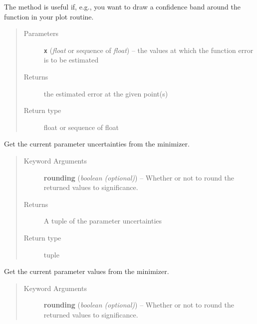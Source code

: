\documentclass[a4paper,10pt,english]{sphinxmanual}
\begin{document}
\begin{fulllineitems}
\begin{fulllineitems}
The method is useful if, e.g., you want to draw a confidence band
around the function in your plot routine.
\begin{quote}\begin{description}
\item[{Parameters}] \leavevmode
\textbf{\texttt{x}} (\emph{float} or sequence of \emph{float}) -- the values at which the function error is to be estimated

\item[{Returns}] \leavevmode
the estimated error at the given point(s)

\item[{Return type}] \leavevmode
float or sequence of float

\end{description}\end{quote}

\end{fulllineitems}


\begin{fulllineitems}
\label{index:kafe.fit.Fit.get_parameter_errors}
Get the current parameter uncertainties from the minimizer.
\begin{quote}\begin{description}
\item[{Keyword Arguments}] \leavevmode
\textbf{rounding} (\emph{boolean (optional)}) --
Whether or not to round the returned values to significance.

\item[{Returns}] \leavevmode
A tuple of the parameter uncertainties

\item[{Return type}] \leavevmode
tuple

\end{description}\end{quote}

\end{fulllineitems}


\begin{fulllineitems}
\label{index:kafe.fit.Fit.get_parameter_values}
Get the current parameter values from the minimizer.
\begin{quote}\begin{description}
\item[{Keyword Arguments}] \leavevmode
\textbf{rounding} (\emph{boolean (optional)}) --
Whether or not to round the returned values to significance.


\end{description}
\end{quote}
\end{fulllineitems}
\end{fulllineitems}
\end{document}
